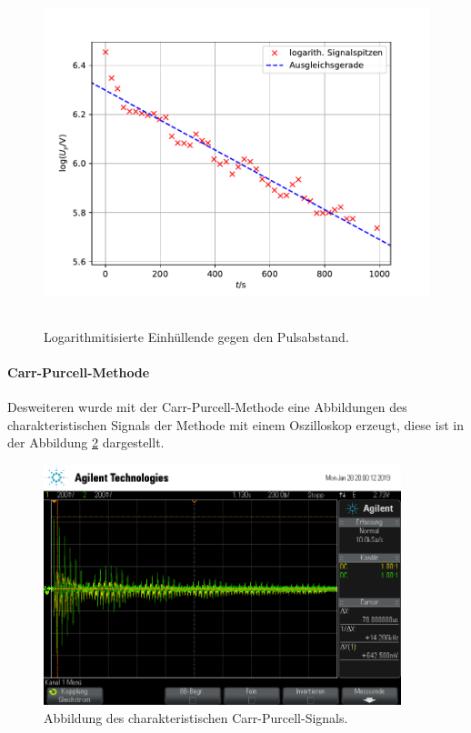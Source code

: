 \begin{figure}
  \centering
  \includegraphics[height = 10cm]{plots/T2plot.pdf}
  \caption{Logarithmitisierte Einhüllende gegen den Pulsabstand.}
  \label{fig:T2}
\end{figure}
\FloatBarrier
\paragraph{Carr-Purcell-Methode}
Desweiteren wurde mit der Carr-Purcell-Methode eine Abbildungen des charakteristischen Signals der Methode mit einem 
Oszilloskop erzeugt, diese ist in der Abbildung \ref{fig:PCM} dargestellt. 
\begin{figure}
  \centering
  \includegraphics[height = 7cm]{plots/scope_3.png}
  \caption{Abbildung des charakteristischen Carr-Purcell-Signals.}
  \label{fig:PCM}
\end{figure}
\FloatBarrier
